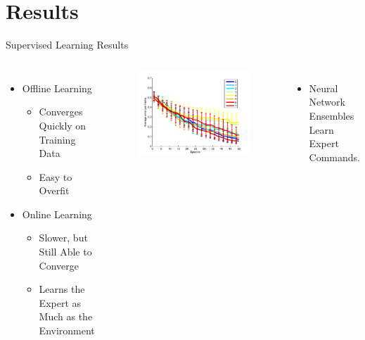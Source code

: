 \documentclass{beamer}
\begin{document}
\section{Results}

	\begin{frame}{Supervised Learning Results}

		\begin{columns}[c c]
		
				\begin{itemize}
				\item Offline Learning
					\begin{itemize}
					\item Converges Quickly on Training Data
					\item Easy to Overfit
					\end{itemize}
				\item Online Learning
					\begin{itemize}
						\item Slower, but Still Able to Converge
						\item Learns the Expert as Much as the Environment
					\end{itemize}
				\end{itemize}


				\begin{figure}
					\begin{center}
						\includegraphics[width=\textwidth]{data.pdf}
					\end{center}
					\label{results}
				\end{figure}

				\begin{itemize}
					\item Neural Network Ensembles Learn Expert Commands.
				\end{itemize}

		\end{columns}

	\end{frame}
\end{document}
